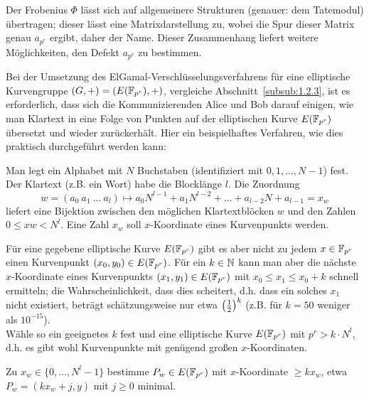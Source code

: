 \begin{bem}
	Der Frobenius $\Phi$ lässt sich auf allgemeinere Strukturen (genauer: dem Tatemodul) übertragen; dieser lässt eine Matrixdarstellung zu, wobei die Spur dieser Matrix genau $a_{p^r}$ ergibt, daher der Name.
	Dieser Zusammenhang liefert weitere Möglichkeiten, den Defekt $a_{p^r}$ zu bestimmen.
\end{bem}

\begin{anw}
\label{anw_17.18}
	Bei der Umsetzung des ElGamal-Verschlüsselungsverfahrens für eine elliptische Kurvengruppe $(G,+) = (E(\mathbb{F}_{p^r}),+)$, vergleiche Abschnitt~\ref{subsub:1.2.3}, ist es erforderlich, dass sich die Kommunizierenden Alice und Bob darauf einigen, wie man Klartext in eine Folge von Punkten auf der elliptischen Kurve $E(\mathbb{F}_{p^r})$ übersetzt und wieder zurückerhält.
	Hier ein beispielhaftes Verfahren, wie dies praktisch durchgeführt werden kann:
\end{anw}

\begin{anw}[Schritt 1]
	Man legt ein Alphabet mit $N$ Buchstaben (identifiziert mit $0,1,\dots,N-1$) fest.
	Der Klartext (z.B. ein Wort) habe die Blocklänge $l$.
	Die Zuordnung 
	\[
		w= (a_0 \ a_1 \ \dots \ a_l) \mapsto a_0 N^{l-1} + a_1 N^{l-2} + \dots + a_{l-2} N + a_{l-1} = x_w
	\]
	liefert eine Bijektion zwischen den möglichen Klartextblöcken $w$ und den Zahlen $0 \leq xw < N^l$.
	Eine Zahl $x_w$ soll $x$-Koordinate eines Kurvenpunkts werden.
\end{anw}


\begin{anw}[Schritt 2]
	Für eine gegebene elliptische Kurve $E(\mathbb{F}_{p^r})$ gibt es aber nicht zu jedem $x \in \mathbb{F}_{p^r}$ einen Kurvenpunkt $(x_0,y_0) \in E(\mathbb{F}_{p^r})$.
	Für ein $k \in \mathbb{N}$ kann man aber die nächste $x$-Koordinate eines Kurvenpunkts $(x_1,y_1) \in E(\mathbb{F}_{p^r})$ mit $x_0 \leq x_1 \leq x_0+k$ schnell ermitteln; die Wahrscheinlichkeit, dass dies scheitert, d.h. dass ein solches $x_1$ nicht existiert, beträgt schätzungsweise nur etwa $\left(\frac{1}{2}\right)^k$
	(z.B. für $k = 50$ weniger als $10^{-15}$). \\
	Wähle so ein geeignetes $k$ fest und eine elliptische Kurve $E(\mathbb{F}_{p^r})$ mit $p^r > k \cdot N^l$, d.h. es gibt wohl Kurvenpunkte mit genügend großen $x$-Koordinaten.
\end{anw}

\begin{anw}[Schritt 3]
	Zu $x_w \in \{0,\dots,N^l-1\}$ bestimme $P_w \in E(\mathbb{F}_{p^r})$ mit $x$-Koordinate $\geq kx_w$, etwa $P_w = (kx_w + j, y)$ mit $j \geq 0$ minimal.
\end{anw}

